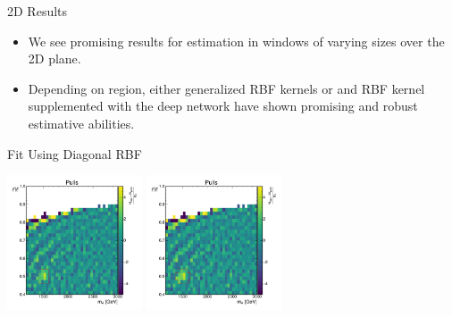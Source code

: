 \documentclass[10pt]{beamer}
\begin{document}
\begin{frame}{2D Results}
  \begin{itemize}
  \item We see promising results for estimation in windows of varying sizes over the 2D plane. 
  \item Depending on region, either generalized RBF kernels or and RBF kernel supplemented with the deep network have shown promising and robust estimative abilities.
  \end{itemize}
\end{frame}

\begin{frame}{Fit Using Diagonal RBF}
  \begin{center}
    \includegraphics[width=0.3\textwidth]{figures/2dpullplots/rbf/E_1500_0p5_100_0p05.pdf} 
    \includegraphics[width=0.3\textwidth]{figures/2dpullplots/rbf/E_1500_0p5_150_0p05.pdf}
  \end{center}


\end{frame}
\end{document}
